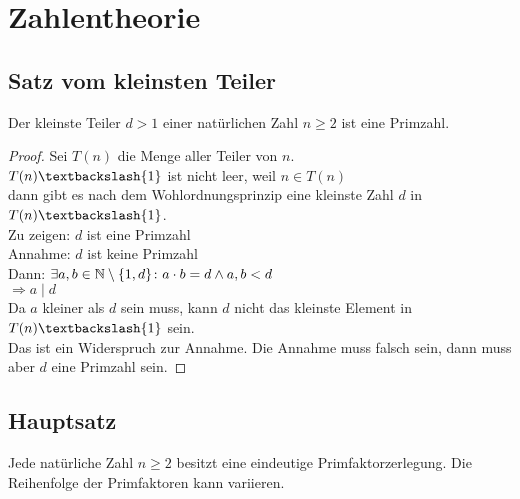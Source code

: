 \section{Zahlentheorie}
\subsection{Satz vom kleinsten Teiler}
Der kleinste Teiler $d > 1$ einer natürlichen Zahl $n \geq 2$ ist eine Primzahl.

\begin{proof}
	Sei $T(n)$ die Menge aller Teiler von $n$.\\
	$T(n)\textbackslash\{1\}$ ist nicht leer, weil $n \in T(n)$\\
	dann gibt es nach dem Wohlordnungsprinzip 
	eine kleinste Zahl $d$ in $T(n)\textbackslash\{1\}$.\\
	Zu zeigen: $d$ ist eine Primzahl\\
	Annahme: $d$ ist keine Primzahl\\
	Dann: $\exists a, b \in \mathbb{N} \setminus\{1, d\} \colon a \cdot b = d \wedge a, b < d$\\
	$\Rightarrow a \mid d$\\
	Da $a$ kleiner als $d$ sein muss, kann $d$ nicht das kleinste Element in $T(n)\textbackslash{1}$ sein.\\
	Das ist ein Widerspruch zur Annahme. Die Annahme muss falsch sein, dann muss aber $d$ eine Primzahl sein.
	\qedhere
\end{proof}

\subsection{Hauptsatz}
Jede natürliche Zahl $n \geq 2$ besitzt eine eindeutige Primfaktorzerlegung.
Die Reihenfolge der Primfaktoren kann variieren.

